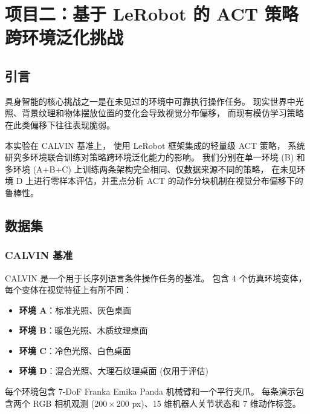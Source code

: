 \documentclass[12pt,a4paper]{ctexart}
\begin{document}

\newpage
\section{项目二：基于 LeRobot 的 ACT 策略跨环境泛化挑战}

\subsection{引言}

具身智能的核心挑战之一是在未见过的环境中可靠执行操作任务。
现实世界中光照、背景纹理和物体摆放位置的变化会导致视觉分布偏移，
而现有模仿学习策略在此类偏移下往往表现脆弱。

本实验在 CALVIN\cite{mees2022calvin} 基准上，
使用 LeRobot\cite{lerobot2024} 框架集成的轻量级 ACT\cite{zhao2023act} 策略，
系统研究多环境联合训练对策略跨环境泛化能力的影响。
我们分别在单一环境 (B) 和多环境 (A+B+C) 上训练两条架构完全相同、仅数据来源不同的策略，
在未见环境 D 上进行零样本评估，并重点分析 ACT 的动作分块机制在视觉分布偏移下的鲁棒性。

\subsection{数据集}

\subsubsection{CALVIN 基准}

CALVIN 是一个用于长序列语言条件操作任务的基准\cite{mees2022calvin}。
包含 4 个仿真环境变体，每个变体在视觉特征上有所不同：

\begin{itemize}[leftmargin=*]
    \item \textbf{环境 A}：标准光照、灰色桌面
    \item \textbf{环境 B}：暖色光照、木质纹理桌面
    \item \textbf{环境 C}：冷色光照、白色桌面
    \item \textbf{环境 D}：混合光照、大理石纹理桌面 (仅用于评估)
\end{itemize}

每个环境包含 7-DoF Franka Emika Panda 机械臂和一个平行夹爪。
每条演示包含两个 RGB 相机观测 ($200\times200$ px)、15 维机器人关节状态和 7 维动作标签。
\end{document}
